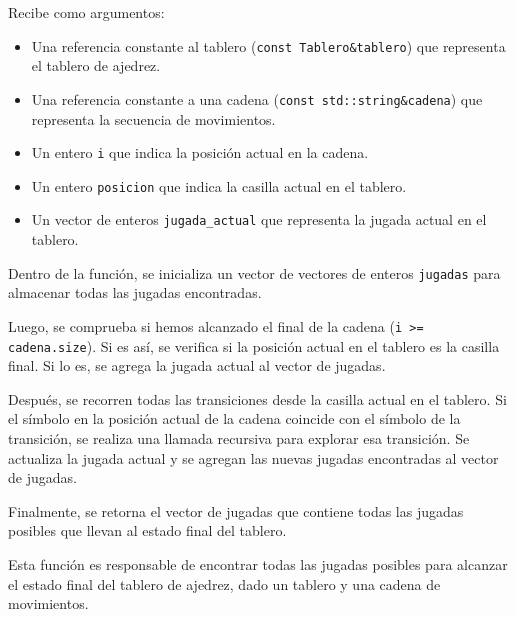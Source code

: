 \documentclass{article}
\begin{document}
        Recibe como argumentos:
        \begin{itemize}
            \item Una referencia constante al tablero (\texttt{const Tablero\&tablero}) que representa el tablero de ajedrez.
            \item Una referencia constante a una cadena (\texttt{const std::string\&cadena}) que representa la secuencia de movimientos.
            \item Un entero \texttt{i} que indica la posición actual en la cadena.
            \item Un entero \texttt{posicion} que indica la casilla actual en el tablero.
            \item Un vector de enteros \texttt{jugada\_actual} que representa la jugada actual en el tablero.
        \end{itemize}

        Dentro de la función, se inicializa un vector de vectores de enteros \texttt{jugadas} para almacenar todas las jugadas
        encontradas.

        Luego, se comprueba si hemos alcanzado el final de la cadena (\texttt{i >= cadena.size}). Si es así, se verifica si la
        posición actual en el tablero es la casilla final. Si lo es, se agrega la jugada actual al vector de jugadas.

        Después, se recorren todas las transiciones desde la casilla actual en el tablero. Si el símbolo en la posición actual de la
        cadena coincide con el símbolo de la transición, se realiza una llamada recursiva para explorar esa transición. Se actualiza
        la jugada actual y se agregan las nuevas jugadas encontradas al vector de jugadas.

        Finalmente, se retorna el vector de jugadas que contiene todas las jugadas posibles que llevan al estado final del tablero.

        Esta función es responsable de encontrar todas las jugadas posibles para alcanzar el estado final del tablero de ajedrez, dado
        un tablero y una cadena de movimientos.
\end{document}
